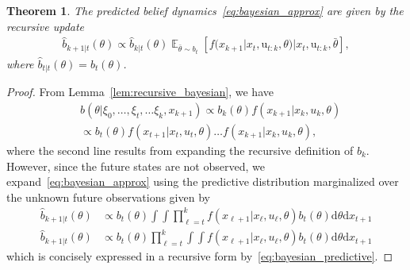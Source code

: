 \documentclass[letterpaper, 10 pt, conference]{IEEEconf}
\newcommand{\Expectation}{\mathop{{}\mathbb{E}}}
\newtheorem{theorem}{Theorem}
\begin{document}
\begin{theorem} \label{thm:predictive_belief}
    The predicted belief dynamics~\eqref{eq:bayesian_approx} are given by the recursive update
    \begin{align} \label{eq:bayesian_predictive}
        \hat{b}_{k+1|t}(\theta) \propto \hat{b}_{k|t}(\theta) \Expectation_{\bar{\theta} \sim b_{t}}[f(x_{k+1} | x_{t}, \mathrm{u}_{t:k}, \theta) | x_{t}, \mathrm{u}_{t:k}, \bar{\theta}],
    \end{align}
    where
    $\hat{b}_{t|t}(\theta) = b_{t}(\theta)$.
\end{theorem}
\begin{proof}
    From Lemma~\ref{lem:recursive_bayesian}, we have 
    \begin{align*}
        & b(\theta | \xi_{0}, \dots,\xi_{t}, \dots \xi_{k}, x_{k+1}) \propto b_{k}(\theta) f(x_{k+1} | x_{k}, u_{k}, \theta) \\
        & \propto b_{t}(\theta) f(x_{t+1} | x_{t}, u_{t}, \theta) \dots f(x_{k+1} | x_{k}, u_{k}, \theta),
    \end{align*}
    where the second line results from expanding the recursive definition of $b_{k}$.
    However, since the future states are not observed, we expand~\eqref{eq:bayesian_approx} using the predictive distribution marginalized over the unknown future observations given by
    \begin{align*}
        \hat{b}_{k+1|t}(\theta) & \propto b_{t}(\theta) \int \int \prod_{\ell=t}^{k} f(x_{\ell+1} | x_{\ell}, u_{\ell}, \theta) b_{t}(\theta) \mathrm{d}\theta \mathrm{d}x_{t+1} \\
        \hat{b}_{k+1|t}(\theta) & \propto b_{t}(\theta) \prod_{\ell=t}^{k} \int \int f(x_{\ell+1} | x_{\ell}, u_{\ell}, \theta) b_{t}(\theta) \mathrm{d}\theta \mathrm{d}x_{t+1}
    \end{align*}
    which is concisely expressed in a recursive form by~\eqref{eq:bayesian_predictive}.
\end{proof}
\end{document}
